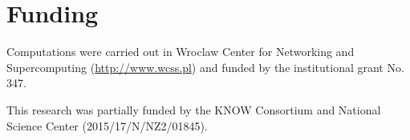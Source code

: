 \documentclass[a4,center,fleqn]{NAR}
\begin{document}
%
%

\section*{Funding}

Computations were carried out in Wroclaw Center for Networking 
and Supercomputing (\url{http://www.wcss.pl}) and funded by the
institutional grant No. 347.

This research was partially funded by the KNOW Consortium and
National Science Center (2015/17/N/NZ2/01845).



\end{document}
